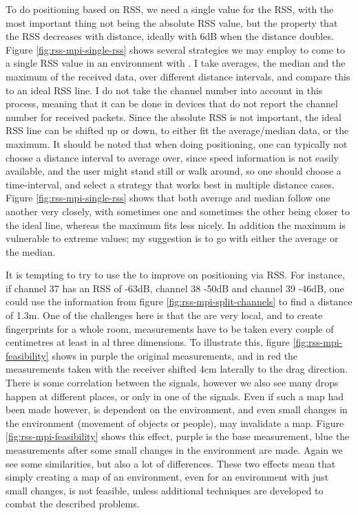 To do positioning based on RSS, we need a single value for the RSS, with the most important thing not being the absolute RSS value, but the property that the RSS decreases with distance, ideally with 6dB when the distance doubles.
Figure \ref{fig:rss-mpi-single-rss} shows several strategies we may employ to come to a single RSS value in an environment with \mpi.
I take averages, the median and the maximum of the received data, over different distance intervals, and compare this to an ideal RSS line.
I do not take the channel number into account in this process, meaning that it can be done in devices that do not report the channel number for received packets.
Since the absolute RSS is not important, the ideal RSS line can be shifted up or down, to either fit the average/median data, or the maximum.
It should be noted that when doing positioning, one can typically not choose a distance interval to average over, since speed information is not easily available, and the user might stand still or walk around, so one should choose a time-interval, and select a strategy that works best in multiple distance cases.
Figure \ref{fig:rss-mpi-single-rss} shows that both average and median follow one another very closely, with sometimes one and sometimes the other being closer to the ideal line, whereas the maximum fits less nicely.
In addition the maximum is vulnerable to extreme values; my suggestion is to go with either the average or the median.



It is tempting to try to use the \mpids to improve on positioning via RSS.
For instance, if channel 37 has an RSS of -63dB, channel 38 -50dB and channel 39 -46dB, one could use the information from figure \ref{fig:rss-mpi-split-channels} to find a distance of 1.3m.
One of the challenges here is that the \mpids are very local, and to create fingerprints for a whole room, measurements have to be taken every couple of centimetres at least in al three dimensions.
To illustrate this, figure \ref{fig:rss-mpi-feasibility} shows in purple the original measurements, and in red the measurements taken with the receiver shifted 4cm laterally to the drag direction.
There is some correlation between the signals, however we also see many drops happen at different places, or only in one of the signals.
Even if such a map had been made however, \mpi is dependent on the environment, and even small changes in the environment (movement of objects or people), may invalidate a map.
Figure \ref{fig:rss-mpi-feasibility} shows this effect, purple is the base measurement, blue the measurements after some small changes in the environment are made.
Again we see some similarities, but also a lot of differences.
These two effects mean that simply creating a map of an environment, even for an environment with just small changes, is not feasible, unless additional techniques are developed to combat the described problems.

